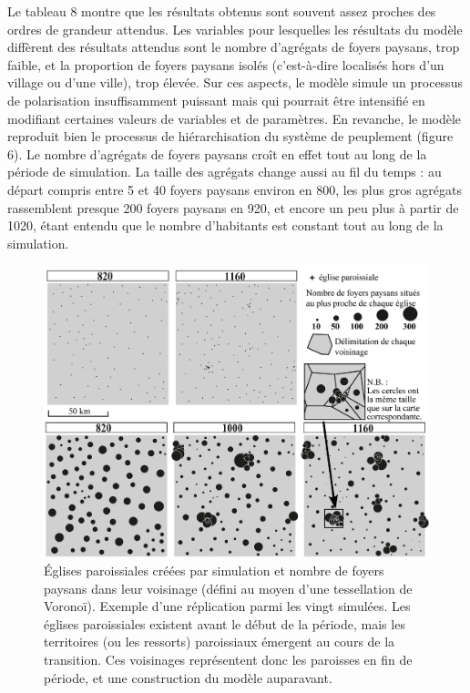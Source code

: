 \documentclass[12pt, a4paper, oneside]{book}
\begin{document}
	Le tableau 8 montre que les résultats obtenus sont souvent assez proches des ordres de grandeur attendus.
	Les variables pour lesquelles les résultats du modèle diffèrent des résultats attendus sont le nombre d'agrégats de foyers paysans, trop faible, et la proportion de foyers paysans isolés (c'est-à-dire localisés hors d'un village ou d'une ville), trop élevée.
	Sur ces aspects, le modèle simule un processus de polarisation insuffisamment puissant mais qui pourrait être intensifié en modifiant certaines valeurs de variables et de paramètres.
	En revanche, le modèle reproduit bien le processus de hiérarchisation du système de peuplement (figure 6).
	Le nombre d'agrégats de foyers paysans croît en effet tout au long de la période de simulation.
	La taille des agrégats change aussi au fil du temps : au départ compris entre 5 et 40 foyers paysans environ en 800, les plus gros agrégats rassemblent presque 200 foyers paysans en 920, et encore un peu plus à partir de 1020, étant entendu que le nombre d'habitants est constant tout au long de la simulation.
	
	\begin{figure}[!h]
		\centering
		\includegraphics[width=1\linewidth]{src/Chapitre_TMD/Fig7}
		\caption{Églises paroissiales créées par simulation et nombre de foyers paysans dans leur voisinage (défini au moyen d’une tessellation de Voronoï).
		Exemple d’une réplication parmi les vingt simulées.
		Les églises paroissiales existent avant le début de la période, mais les territoires (ou les ressorts) paroissiaux émergent au cours de la transition.
		Ces voisinages représentent donc les paroisses en fin de période, et une construction du modèle auparavant.}
		\label{fig:fig7}
	\end{figure}
\end{document}
